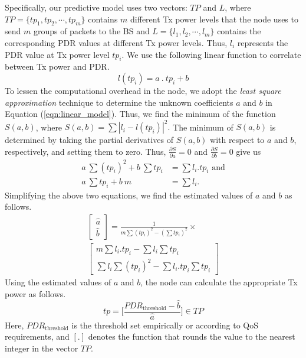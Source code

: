 Specifically, our predictive model uses two vectors: $TP$ and $L$, where $TP = \{ tp_1, tp_2, \cdots, tp_m \}$ contains $m$ different Tx power levels that the node uses to send $m$ groups of packets to the BS and $L = \{ l_1, l_2, \cdots, l_m \}$ contains the corresponding PDR values at different Tx power levels. Thus, $l_i$ represents the PDR value at Tx power level $tp_i$. We use the following linear function to correlate between Tx power and PDR.
\begin{equation}
	l(tp_i) = a~.~tp_i + b \label{eqn:linear_model}
\end{equation}
To lessen the computational overhead in the node, we adopt the {\em least square approximation} technique to determine the unknown coefficients $a$ and $b$ in Equation (\ref{eqn:linear_model}). Thus, we find the minimum of the function $S(a, b)$, where $\nonumber S(a, b) = \sum |l_i - l(tp_i)|^2.$
The minimum of $S(a, b)$ is determined by taking the partial derivatives of $S(a, b)$ with respect to $a$ and $b$, respectively, and setting them to zero. Thus, $ \frac{\partial S}{\partial a} = 0$ and $\frac{\partial S}{\partial b} = 0$ give us
\begin{align}
	\nonumber a~\sum (tp_i)^2 + b~\sum tp_i &= \sum l_i.tp_i \text{ and} \\ 
  \nonumber a~\sum tp_i + b~m &= \sum l_i.
\end{align}
Simplifying the above two equations, we find the estimated values of $a$ and $b$ as follows.
\begin{equation}\nonumber
\begin{split}
	\begin{bmatrix}
		\hat{a}\\
        \hat{b}
	\end{bmatrix}
    = \frac{1}{m \sum (tp_i)^2 - (\sum tp_i)^2} \times \\
    \begin{bmatrix}
    	m \sum l_i.tp_i - \sum l_i \sum tp_i\\
    	\sum l_i \sum (tp_i)^2 - \sum l_i.tp_i \sum tp_i
    \end{bmatrix}
\end{split}
\end{equation}
Using the estimated values of $a$ and $b$, the node can calculate the appropriate Tx power as follows.
\begin{equation}\label{eqn:estimated}
tp = \big[\frac{PDR_{\text{threshold}} - \hat{b}}{\hat{a}}\big] \in TP
\end{equation}
Here, $PDR_{\text{threshold}}$ is the threshold set empirically or according to QoS requirements, and $[.]$ denotes the function that rounds the value to the nearest integer in the vector $TP$.

